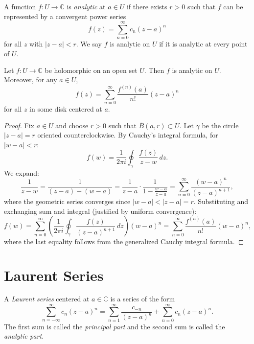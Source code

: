 \begin{definition}
  A function $f : U \to \mathbb{C}$ is \emph{analytic} at $a \in U$ if there exists $r > 0$ such that $f$ can be represented by a convergent power series
  \begin{equation}
    f(z) = \sum_{n=0}^{\infty} c_n (z - a)^n
  \end{equation}
  for all $z$ with $|z - a| < r$. We say $f$ is analytic on $U$ if it is analytic at every point of $U$.
\end{definition}

\begin{theorem}
  Let $f : U \to \mathbb{C}$ be holomorphic on an open set $U$. Then $f$ is analytic on $U$. Moreover, for any $a \in U$,
  \begin{equation}
    f(z) = \sum_{n=0}^{\infty} \frac{f^{(n)}(a)}{n!} (z - a)^n
  \end{equation}
  for all $z$ in some disk centered at $a$.
\end{theorem}

\begin{proof}
  Fix $a \in U$ and choose $r > 0$ such that $\overline{B}(a, r) \subset U$. Let $\gamma$ be the circle $|z - a| = r$ oriented counterclockwise.
  By Cauchy's integral formula, for $|w - a| < r$:
  \[
    f(w) = \frac{1}{2\pi i} \oint_{\gamma} \frac{f(z)}{z - w} \, dz.
  \]
  We expand:
  \[
    \frac{1}{z - w} = \frac{1}{(z - a) - (w - a)} = \frac{1}{z - a} \cdot \frac{1}{1 - \frac{w - a}{z - a}} = \sum_{n=0}^{\infty} \frac{(w - a)^n}{(z - a)^{n+1}},
  \]
  where the geometric series converges since $|w - a| < |z - a| = r$.
  Substituting and exchanging sum and integral (justified by uniform convergence):
  \[
    f(w) = \sum_{n=0}^{\infty} \left( \frac{1}{2\pi i} \oint_{\gamma} \frac{f(z)}{(z - a)^{n+1}} \, dz \right) (w - a)^n = \sum_{n=0}^{\infty} \frac{f^{(n)}(a)}{n!} (w - a)^n,
  \]
  where the last equality follows from the generalized Cauchy integral formula.
\end{proof}

\section{Laurent Series}

\begin{definition}
  A \emph{Laurent series} centered at $a \in \mathbb{C}$ is a series of the form
  \begin{equation}
    \sum_{n=-\infty}^{\infty} c_n (z - a)^n = \sum_{n=1}^{\infty} \frac{c_{-n}}{(z - a)^n} + \sum_{n=0}^{\infty} c_n (z - a)^n.
  \end{equation}
  The first sum is called the \emph{principal part} and the second sum is called the \emph{analytic part}.
\end{definition}

